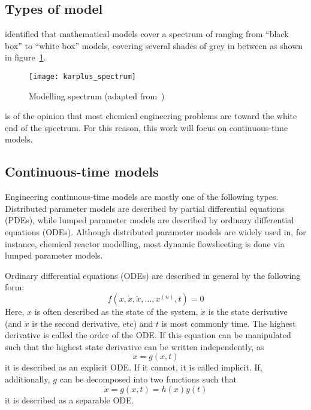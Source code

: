 \subsection{Types of model}
\citet{karplus1977spectrum} identified that mathematical models cover a spectrum of ranging from ``black box'' to ``white box'' models, covering several shades of grey in between as shown in figure~\ref{fig:karplusspectrum}.
\begin{figure}[htbp]
  \centering
  \texttt{[image: karplus\_spectrum]}
%  
  \caption[Modelling spectrum]{Modelling spectrum (adapted from~\citet{karplus1977spectrum})}
  \label{fig:karplusspectrum}
\end{figure}
\citet[15]{cellier1991continuous} is of the opinion that most chemical engineering problems are toward the white end of the spectrum.
For this reason, this work will focus on continuous-time models.



\subsection{Continuous-time models}
\label{sec:cont-time-models}
Engineering continuous-time models are mostly one of the following types.
Distributed parameter models are described by partial differential equations (PDEs), while lumped parameter models are described by ordinary differential equations (ODEs).
Although distributed parameter models are widely used in, for instance, chemical reactor modelling, most dynamic flowsheeting is done via lumped parameter models.

Ordinary differential equations (ODEs) are described in general by the following form:
\begin{equation}
  \label{eq:odeform}
  f(x, \dot{x}, \ddot{x}, \ldots, x^{(n)}, t) = 0
\end{equation}
Here, $x$ is often described as the state of the system, $\dot{x}$ is the state derivative (and $\ddot{x}$ is the second derivative, etc) and $t$ is most commonly time.
The highest derivative is called the order of the ODE.
If this equation can be manipulated such that the highest state derivative can be written independently, as
\begin{equation}
  \label{eq:odeform_explicit}
  \dot{x} = g(x, t)
\end{equation}
it is described as an explicit ODE.  
If it cannot, it is called implicit.  
If, additionally, $g$ can be decomposed into two functions such that 
\begin{equation}
  \label{eq:odeform_seperable}
  \dot{x} = g(x, t) = h(x)y(t)
\end{equation}
it is described as a separable ODE.

